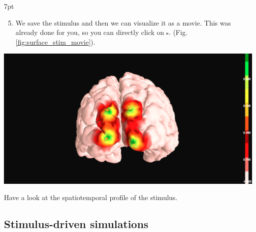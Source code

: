 \documentclass{tufte-handout}
\newenvironment{formal}{%
  \def\FrameCommand{%
    \hspace{1pt}%
    {\color{DarkBlue}\vrule width 2pt}%
    {\color{formalshade}\vrule width 4pt}%
    \colorbox{formalshade}%
  }%
  \MakeFramed{\advance\hsize-\width\FrameRestore}%
  \noindent\hspace{-4.55pt}%
  \begin{adjustwidth}{}{7pt}%
  \vspace{2pt}\vspace{2pt}%
}
{%
  \vspace{2pt}\end{adjustwidth}\endMakeFramed%
}
\begin{document}
\begin{formal}
\begin{enumerate}
\setcounter{enumi}{4}
\item We save the stimulus and then we can visualize it as a movie. This was already done for you, so you can directly click on \includegraphics[width=0.01\textwidth]{butt_launch_project.png}. (Fig. \ref{fig:surface_stim_movie}).
\end{enumerate}
\end{formal}
 
 \begin{marginfigure}
  \includegraphics[width=\linewidth]{Handout_UI_HeterogenousModelAndStimulation_StimulusSurfaceMovie}%
  \caption{Have a look at the spatiotemporal profile of the stimulus.}%
  \label{fig:surface_stim_movie}%
\end{marginfigure}


\subsection{Stimulus-driven simulations}\label{sec:stim_sim}
\end{document}
